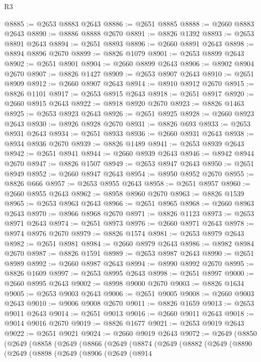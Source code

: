 \begin{lexlean}{R3}
\begin{coremodule}
@8885 := @2653 @8883 @2643
@8886 := @2651 @8885
@8888 := @2660 @8883 @2643
@8890 := @8886 @8888 @2670
@8891 := @8826 @1392
@8893 := @2653 @8891 @2643
@8894 := @2651 @8893
@8896 := @2660 @8891 @2643
@8898 := @8894 @8896 @2670
@8899 := @8826 @1079
@8901 := @2653 @8899 @2643
@8902 := @2651 @8901
@8904 := @2660 @8899 @2643
@8906 := @8902 @8904 @2670
@8907 := @8826 @1427
@8909 := @2653 @8907 @2643
@8910 := @2651 @8909
@8912 := @2660 @8907 @2643
@8914 := @8910 @8912 @2670
@8915 := @8826 @1101
@8917 := @2653 @8915 @2643
@8918 := @2651 @8917
@8920 := @2660 @8915 @2643
@8922 := @8918 @8920 @2670
@8923 := @8826 @1463
@8925 := @2653 @8923 @2643
@8926 := @2651 @8925
@8928 := @2660 @8923 @2643
@8930 := @8926 @8928 @2670
@8931 := @8826 @693
@8933 := @2653 @8931 @2643
@8934 := @2651 @8933
@8936 := @2660 @8931 @2643
@8938 := @8934 @8936 @2670
@8939 := @8826 @1489
@8941 := @2653 @8939 @2643
@8942 := @2651 @8941
@8944 := @2660 @8939 @2643
@8946 := @8942 @8944 @2670
@8947 := @8826 @1507
@8949 := @2653 @8947 @2643
@8950 := @2651 @8949
@8952 := @2660 @8947 @2643
@8954 := @8950 @8952 @2670
@8955 := @8826 @666
@8957 := @2653 @8955 @2643
@8958 := @2651 @8957
@8960 := @2660 @8955 @2643
@8962 := @8958 @8960 @2670
@8963 := @8826 @1539
@8965 := @2653 @8963 @2643
@8966 := @2651 @8965
@8968 := @2660 @8963 @2643
@8970 := @8966 @8968 @2670
@8971 := @8826 @1123
@8973 := @2653 @8971 @2643
@8974 := @2651 @8973
@8976 := @2660 @8971 @2643
@8978 := @8974 @8976 @2670
@8979 := @8826 @1574
@8981 := @2653 @8979 @2643
@8982 := @2651 @8981
@8984 := @2660 @8979 @2643
@8986 := @8982 @8984 @2670
@8987 := @8826 @1591
@8989 := @2653 @8987 @2643
@8990 := @2651 @8989
@8992 := @2660 @8987 @2643
@8994 := @8990 @8992 @2670
@8995 := @8826 @1609
@8997 := @2653 @8995 @2643
@8998 := @2651 @8997
@9000 := @2660 @8995 @2643
@9002 := @8998 @9000 @2670
@9003 := @8826 @1634
@9005 := @2653 @9003 @2643
@9006 := @2651 @9005
@9008 := @2660 @9003 @2643
@9010 := @9006 @9008 @2670
@9011 := @8826 @1659
@9013 := @2653 @9011 @2643
@9014 := @2651 @9013
@9016 := @2660 @9011 @2643
@9018 := @9014 @9016 @2670
@9019 := @8826 @1677
@9021 := @2653 @9019 @2643
@9022 := @2651 @9021
@9024 := @2660 @9019 @2643
@9072 := @2649
    (@8850
      (@2649
        (@8858
          (@2649
            (@8866
              (@2649
                (@8874
                  (@2649
                    (@8882
                      (@2649
                        (@8890
                          (@2649
                            (@8898
                              (@2649
                                (@8906
                                  (@2649
                                    (@8914

\end{coremodule}
\end{lexlean}

